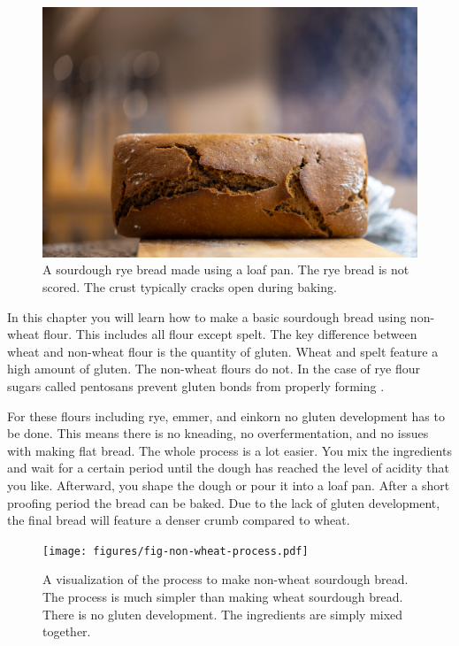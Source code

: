 \begin{figure}[!htb]
  \includegraphics[width=\textwidth]{final-bread}
  \caption{A sourdough rye bread made using a loaf pan. The
  rye bread is not scored. The crust typically cracks
  open during baking.}
  \label{fig:non-wheat-final-bread}
\end{figure}

In this chapter you will learn how to make a basic sourdough bread
using non-wheat flour. This includes all flour except spelt.
The key difference between wheat and non-wheat flour is
the quantity of gluten. Wheat and spelt feature a high amount
of gluten. The non-wheat flours do not. In the case of rye flour
sugars called pentosans prevent gluten bonds from properly
forming \cite{rye+pentosans}.

For these flours including rye, emmer, and einkorn no gluten
development has to be done. This means there is no kneading,
no overfermentation, and no issues with making flat bread.
The whole process
is a lot easier. You mix the ingredients and
wait for a certain period until the dough has
reached the level of acidity that you like. Afterward, you
shape the dough or pour it into a loaf pan. After a short proofing
period the bread can be baked. Due to the lack
of gluten development, the final bread will feature a denser
crumb compared to wheat.

\begin{figure}[!htb]
  \texttt{[image: figures/fig-non-wheat-process.pdf]}
  \caption{A visualization of the process to make non-wheat sourdough bread.
  The process is much simpler than making wheat sourdough bread. There is
  no gluten development. The ingredients are simply mixed together.}
  \label{fig:non-wheat-sourdough}
\end{figure}

